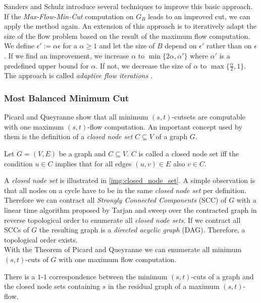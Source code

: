 Sanders and Schulz \cite{sanders2011engineering} introduce several techniques to improve
this basic approach. If the \emph{Max-Flow-Min-Cut} computation on $G_B$ leads to an
improved cut, we can apply the method again. 
An extension of this approach is to iteratively adapt the
size of the flow problem based on the result of the maximum flow computation.
We define $\epsilon' := \alpha\epsilon$ for a $\alpha \ge 1$ and let the size of $B$ depend
on $\epsilon'$ rather than on $\epsilon$. If we find an improvement, we
increase $\alpha$ to $\min\{2\alpha, \alpha'\}$ where $\alpha'$ is a predefined upper bound
for $\alpha$. If not, we decrease the size of $\alpha$ to 
$\max\{\frac{\alpha}{2},1\}$. The approach is called
\emph{adaptive flow iterations} \cite{sanders2011engineering}.

\subsubsection{Most Balanced Minimum Cut}
\label{sec:related_mbmc}

Picard and Queyranne \cite{picard1980structure} show that all minimum $(s,t)$-cutsets 
are computable with one maximum $(s,t)$-flow computation.
An important concept used by them is the definition
of a \emph{closed node set} $C \subseteq V$ of a graph $G$.

\begin{definition}
Let $G = (V,E)$ be a graph and $C \subseteq V$. $C$ is called a closed node set iff the 
condition $u \in C$ implies that for all edges $(u,v) \in E$ also $v \in C$.
\end{definition}

A \emph{closed node set} is illustrated in \autoref{img:closed_node_set}. A simple observation
is that all nodes on a cycle have to be in the same \emph{closed node set} per definition. Therefore
we can contract all \emph{Strongly Connected Components} (SCC) of $G$ with a linear time algorithm
proposed by Tarjan \cite{tarjan1972depth} and sweep over the contracted graph in reverse
topological order to enumerate all \emph{closed node sets}. If
we contract all SCCs of $G$ the resulting graph is a \emph{directed acyclic graph} (DAG). Therefore, 
a topological order exists. \\
With the Theorem of Picard and Queyranne \cite{picard1980structure} we can enumerate
all minimum $(s,t)$-cuts of $G$ with one maximum flow computation.

\begin{theorem}
\label{theorem:mbmc}
There is a $1$-$1$ correspondence between the minimum $(s,t)$-cuts of a graph and the closed node
sets containing $s$ in the residual graph of a maximum $(s,t)$-flow.
\end{theorem}


